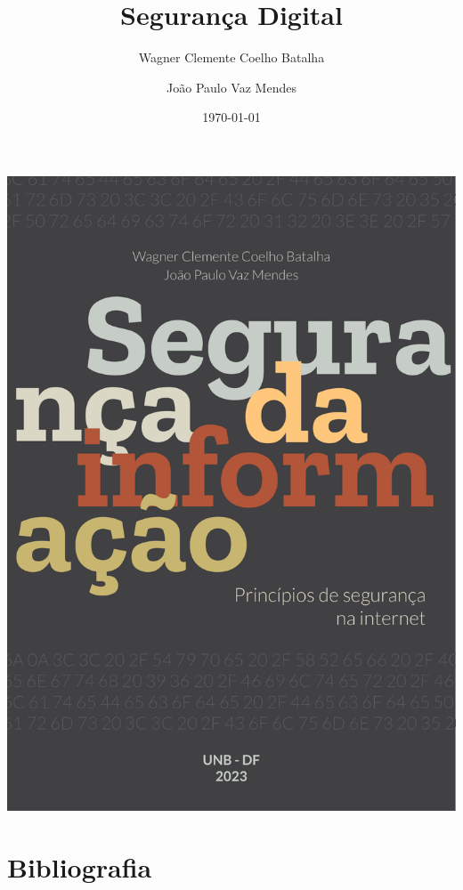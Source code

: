 \documentclass[openany,a5paper,16pt]{mystyle}
\title{Segurança Digital}
\author{Wagner Clemente Coelho Batalha \and João Paulo Vaz Mendes}
\date{\today}
\begin{document}
\titlepage 
	{\includegraphics[height=\paperheight]{img/title.pdf}}

\tableofcontents






\part{Bibliografia}
\printbibliography
\end{document}

